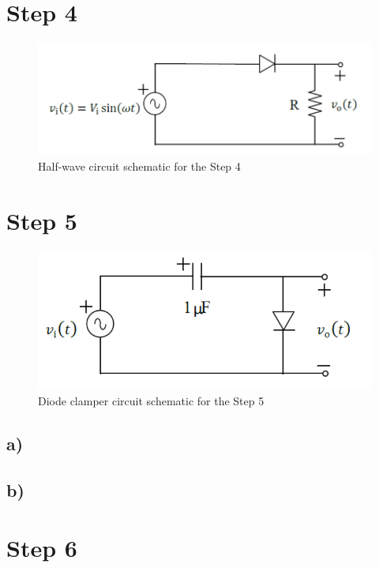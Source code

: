 \documentclass[letterpaper,12pt]{article}
\begin{document}
\section{Step 4}


\begin{figure}[H]
    \centering
   \includegraphics[width=1\textwidth]{4_1.png}
   \caption{Half-wave circuit schematic for the Step 4}
\end{figure} 

\section{Step 5}

\begin{figure}[H]
    \centering
   \includegraphics[width=1\textwidth]{5_1.png}
   \caption{Diode clamper circuit schematic for the Step 5}
\end{figure} 

\subsection{a)}
\subsection{b)}
\section{Step 6}
\end{document}
